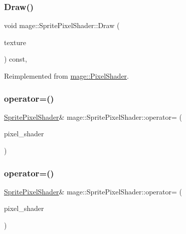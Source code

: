 \subsubsection{\texorpdfstring{Draw()}{Draw()}}
{\footnotesize\ttfamily void mage\+::\+Sprite\+Pixel\+Shader\+::\+Draw (\begin{DoxyParamCaption}\item[{I\+D3\+D11\+Shader\+Resource\+View $\ast$const $\ast$}]{texture }\end{DoxyParamCaption}) const\hspace{0.3cm}{\ttfamily [override]}, {\ttfamily [virtual]}}



Reimplemented from \hyperlink{classmage_1_1_pixel_shader_ac9d71d866f79e155db729d8890b9ca78}{mage\+::\+Pixel\+Shader}.

\hypertarget{classmage_1_1_sprite_pixel_shader_adf6e6f0872406b9df46cb87731ed1ae0}{}\label{classmage_1_1_sprite_pixel_shader_adf6e6f0872406b9df46cb87731ed1ae0} 
\subsubsection{\texorpdfstring{operator=()}{operator=()}\hspace{0.1cm}{\footnotesize\ttfamily [1/2]}}
{\footnotesize\ttfamily \hyperlink{classmage_1_1_sprite_pixel_shader}{Sprite\+Pixel\+Shader}\& mage\+::\+Sprite\+Pixel\+Shader\+::operator= (\begin{DoxyParamCaption}\item[{const \hyperlink{classmage_1_1_sprite_pixel_shader}{Sprite\+Pixel\+Shader} \&}]{pixel\+\_\+shader }\end{DoxyParamCaption})\hspace{0.3cm}{\ttfamily [delete]}}

\hypertarget{classmage_1_1_sprite_pixel_shader_ad982c266c5ba3510009a3f5e7519e284}{}\label{classmage_1_1_sprite_pixel_shader_ad982c266c5ba3510009a3f5e7519e284} 
\subsubsection{\texorpdfstring{operator=()}{operator=()}\hspace{0.1cm}{\footnotesize\ttfamily [2/2]}}
{\footnotesize\ttfamily \hyperlink{classmage_1_1_sprite_pixel_shader}{Sprite\+Pixel\+Shader}\& mage\+::\+Sprite\+Pixel\+Shader\+::operator= (\begin{DoxyParamCaption}\item[{\hyperlink{classmage_1_1_sprite_pixel_shader}{Sprite\+Pixel\+Shader} \&\&}]{pixel\+\_\+shader }\end{DoxyParamCaption})\hspace{0.3cm}{\ttfamily [delete]}}

